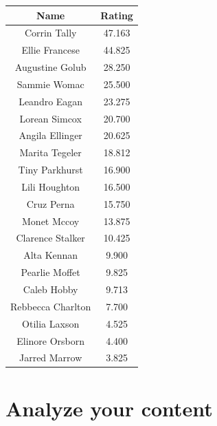 \documentclass{article}
\begin{document}
      \begin{table}[H]
        \centering
        \begin{tabular}{|c|c|}
          \hline
          \textbf{Name} & \textbf{Rating} \\ \hline
          Corrin Tally      & 47.163 \\ \hline
          Ellie Francese    & 44.825 \\ \hline
          Augustine Golub   & 28.250 \\ \hline
          Sammie Womac      & 25.500 \\ \hline
          Leandro Eagan     & 23.275 \\ \hline
          Lorean Simcox     & 20.700 \\ \hline
          Angila Ellinger   & 20.625 \\ \hline
          Marita Tegeler    & 18.812 \\ \hline
          Tiny Parkhurst    & 16.900 \\ \hline
          Lili Houghton     & 16.500 \\ \hline
          Cruz Perna        & 15.750 \\ \hline
          Monet Mccoy       & 13.875 \\ \hline
          Clarence Stalker  & 10.425 \\ \hline
          Alta Kennan       &  9.900 \\ \hline
          Pearlie Moffet    &  9.825 \\ \hline
          Caleb Hobby       &  9.713 \\ \hline
          Rebbecca Charlton &  7.700 \\ \hline
          Otilia Laxson     &  4.525 \\ \hline
          Elinore Orsborn   &  4.400 \\ \hline
          Jarred Marrow     &  3.825 \\ \hline

        \end{tabular}
      \end{table}

    \newpage

    \section{Analyze your content}
\end{document}
